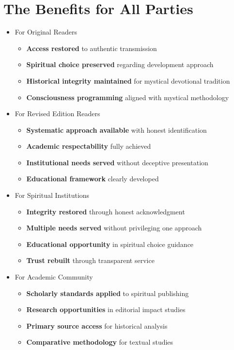 \documentclass[11pt,twoside]{book}
\begin{document}
\section*{The Benefits for All Parties}
\label{sec:orgaad7fe0}

\begin{itemize}
\item For Original Readers
\label{sec:org215fb1a}
\begin{itemize}
\item \textbf{\textbf{Access restored}} to authentic transmission
\item \textbf{\textbf{Spiritual choice preserved}} regarding development approach
\item \textbf{\textbf{Historical integrity maintained}} for mystical devotional tradition
\item \textbf{\textbf{Consciousness programming}} aligned with mystical methodology
\end{itemize}
\item For Revised Edition Readers
\label{sec:org25deb00}
\begin{itemize}
\item \textbf{\textbf{Systematic approach available}} with honest identification
\item \textbf{\textbf{Academic respectability}} fully achieved
\item \textbf{\textbf{Institutional needs served}} without deceptive presentation
\item \textbf{\textbf{Educational framework}} clearly developed
\end{itemize}
\item For Spiritual Institutions
\label{sec:orgb0288e7}
\begin{itemize}
\item \textbf{\textbf{Integrity restored}} through honest acknowledgment
\item \textbf{\textbf{Multiple needs served}} without privileging one approach
\item \textbf{\textbf{Educational opportunity}} in spiritual choice guidance
\item \textbf{\textbf{Trust rebuilt}} through transparent service
\end{itemize}
\item For Academic Community
\label{sec:orge1ec539}
\begin{itemize}
\item \textbf{\textbf{Scholarly standards applied}} to spiritual publishing
\item \textbf{\textbf{Research opportunities}} in editorial impact studies
\item \textbf{\textbf{Primary source access}} for historical analysis
\item \textbf{\textbf{Comparative methodology}} for textual studies
\end{itemize}
\end{itemize}
\end{document}
